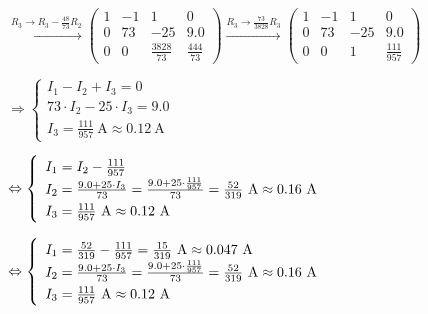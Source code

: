 \begin{description}[labelwidth=1.5cm, leftmargin=!]
                    $ \xrightarrow{R_3 \to R_3 - \frac{48}{73} R_2} 
                    \left(\begin{array}{ccc|c}
                        1  & -1 & 1               & 0   \\
                        0  & 73 & -25             & 9.0 \\
                        0  & 0  & \frac{3828}{73} & \frac{444}{73}
                    \end{array}\right)
                    \xrightarrow{R_3 \to \frac{73}{3828} R_3} 
                    \left(\begin{array}{ccc|c}
                        1  & -1 & 1   & 0   \\
                        0  & 73 & -25 & 9.0 \\
                        0  & 0  & 1   & \frac{111}{957}
                    \end{array}\right)$
                    
                    \hspace{-0.57cm} $ \Rightarrow 
                    \left\{\begin{array}{l}
                        I_1 - I_2 + I_3 = 0 \\
                        73 \cdot I_2 - 25 \cdot I_3 = 9.0 \\
                        I_3 = \frac{111}{957} \ \textrm{A} \approx 0.12 \ \textrm{A}
                    \end{array}\right. $
                    
                    \hspace{-0.57cm} $ \Leftrightarrow 
                    \left\{\def\arraystretch{1.3}\begin{array}{l}
                        I_1 = I_2 - \frac{111}{957} \\
                        I_2 = \frac{9.0 + 25 \cdot I_3}{73} = \frac{9.0 + 25 \cdot \frac{111}{957}}{73} = \frac{52}{319} \ \textrm{A} \approx 0.16 \ \textrm{A} \\
                        I_3 = \frac{111}{957} \ \textrm{A} \approx 0.12 \ \textrm{A}
                    \end{array}\right. $
                    
                    \hspace{-0.57cm} $ \Leftrightarrow 
                    \left\{\def\arraystretch{1.3}\begin{array}{l}
                        I_1 = \frac{52}{319} - \frac{111}{957} = \frac{15}{319} \ \textrm{A} \approx 0.047 \ \textrm{A} \\
                        I_2 = \frac{9.0 + 25 \cdot I_3}{73} = \frac{9.0 + 25 \cdot \frac{111}{957}}{73} = \frac{52}{319} \ \textrm{A} \approx 0.16 \ \textrm{A} \\
                        I_3 = \frac{111}{957} \ \textrm{A} \approx 0.12 \ \textrm{A}
                    \end{array}\right. $
\end{description}

\vspace{1cm}